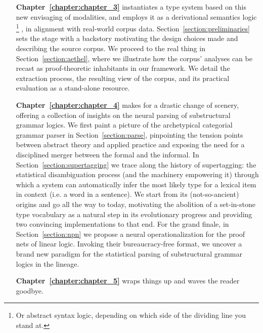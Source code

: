 {\begin{enumerate}[labelindent=2pt, itemindent=30pt, labelsep=5pt, widest=Chapter III,align=right,itemsep=5pt]
Unsatisfied by the comparison, we move on to Section~\ref{section:modalities_for_dependency}, where we appropriate the modalities we resorted to earlier, repurposing them now as dependency domain demarcators.
\item[\textbf{Chapter~\ref{chapter:chapter_3}}] instantiates a type system based on this new envisaging of modalities, and employs it as a derivational semantics logic%
	\footnote{Or abstract syntax logic, depending on which side of the dividing line you stand at.}%
, in alignment with real-world corpus data. 
Section~\ref{section:preliminaries} sets the stage with a backstory motivating the design choices made and describing the source corpus.
We proceed to the real thing in Section~\ref{section:aethel}, where we illustrate how the corpus' analyses can be recast as proof-theoretic inhabitants in our framework.
We detail the extraction process, the resulting view of the corpus, and its practical evaluation as a stand-alone resource.
\item[\textbf{Chapter~\ref{chapter:chapter_4}}] makes for a drastic change of scenery, offering a collection of insights on the neural parsing of substructural grammar logics.
We first paint a picture of the archetypical categorial grammar parser in Section~\ref{section:parse}, pinpointing the tension points between abstract theory and applied practice and exposing the need for a disciplined merger between the formal and the informal.
In Section~\ref{section:supertagging} we trace along the history of supertagging: the statistical disambiguation process (and the machinery empowering it) through which a system can automatically infer the most likely type for a lexical item in context (i.e. a word in a sentence).
We start from its (not-so-ancient) origins and go all the way to today, motivating the abolition of a set-in-stone type vocabulary as a natural step in its evolutionary progress and providing two convincing implementations to that end.
For the grand finale, in Section~\ref{section:npn} we propose a neural operationalization for the proof nets of linear logic.
Invoking their bureaucracy-free format, we uncover a brand new paradigm for the statistical parsing of substructural grammar logics in the  lineage.
\item[\textbf{Chapter~\ref{chapter:chapter_5}}] wraps things up and waves the reader goodbye.
\end{enumerate}

}
